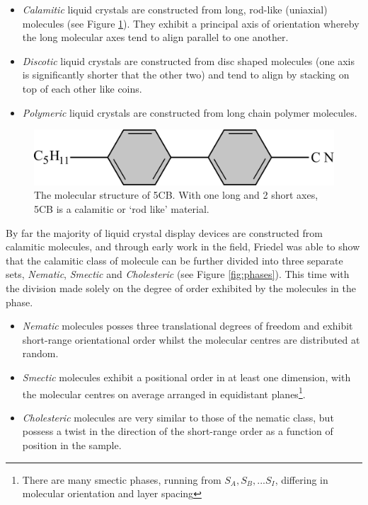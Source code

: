 \begin{itemize}
\item \textit{Calamitic} liquid crystals are constructed from long, rod-like (uniaxial) molecules (see Figure \ref{fig:5cb_molecule}). They exhibit a principal axis of orientation whereby the long molecular axes tend to align parallel to one another.
\item \textit{Discotic} liquid crystals are constructed from disc shaped molecules (one axis is significantly shorter that the other two) and tend to align by stacking on top of each other like coins.
\item \textit{Polymeric} liquid crystals are constructed from long chain polymer molecules.
\end{itemize}

\begin{figure}
\begin{center}
\includegraphics{figures/introduction/5CB_molecule.pdf}
\end{center}
\caption[The molecular structure of 5CB]{\label{fig:5cb_molecule} The molecular structure of 5CB. With one long and 2 short axes, 5CB is a calamitic or `rod like' material.}
\end{figure}

By far the majority of liquid crystal display devices are constructed from calamitic molecules, and through early work in the field, Friedel  \cite{Friedel1922} was able to show that the calamitic class of molecule can be further divided into three separate sets, \textit{Nematic}, \textit{Smectic} and \textit{Cholesteric} (see Figure \ref{fig:phases}). This time with the division made solely on the degree of order exhibited by the molecules in the phase.

\begin{itemize}
\item \textit{Nematic} molecules posses three translational degrees of freedom and exhibit short-range orientational order whilst the molecular centres are distributed at random.
\item \textit{Smectic} molecules exhibit a positional order in at least one dimension, with the molecular centres on average arranged in equidistant planes\footnote{There are many smectic phases, running from $S_A,S_B,...S_I$, differing in molecular orientation and layer spacing}.
\item \textit{Cholesteric} molecules are very similar to those of the nematic class, but possess a twist in the direction of the short-range order as a function of position in the sample. 
\end{itemize}


